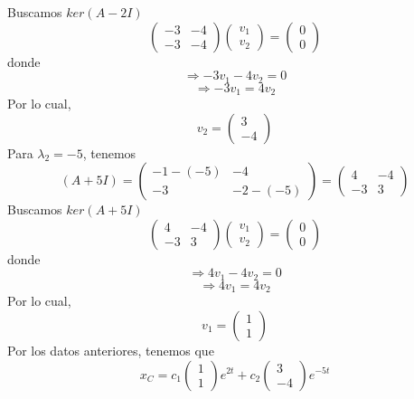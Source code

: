 Buscamos $ker(A-2I)$
\begin{equation*}
\begin{pmatrix}
     -3 & -4\\
     -3 & -4
     \end{pmatrix}
\begin{pmatrix}
v_{1}\\
v_{2}  
\end{pmatrix} =
\begin{pmatrix}
0\\
0  
\end{pmatrix}
\end{equation*} donde
$$\Rightarrow -3v_1-4v_2 = 0$$
$$\Rightarrow -3v_1 = 4v_2$$ Por lo cual, 
$$v_2 = \begin{pmatrix}
3\\
-4
\end{pmatrix}$$ Para $\lambda_2 = -5$, tenemos
\begin{equation*}
     (A+5I) =
     \begin{pmatrix}
     -1-(-5) & -4 \\
     -3 & -2-(-5)
     \end{pmatrix}
     =
     \begin{pmatrix}
     4 & -4\\
     -3 & 3
     \end{pmatrix}
\end{equation*}
Buscamos $ker(A+5I)$
\begin{equation*}
\begin{pmatrix}
     4 & -4\\
     -3 & 3
     \end{pmatrix}
\begin{pmatrix}
v_{1}\\
v_{2}  
\end{pmatrix} =
\begin{pmatrix}
0\\
0  
\end{pmatrix}
\end{equation*} donde
$$\Rightarrow 4v_1-4v_2 = 0$$
$$\Rightarrow 4v_1 = 4v_2$$ Por lo cual, 
$$v_1 = \begin{pmatrix}
1\\
1
\end{pmatrix}$$ Por los datos anteriores, tenemos que 
$$x_C = c_1 \begin{pmatrix}
     1\\
     1
     \end{pmatrix}e^{2t} + c_2 \begin{pmatrix}
     3\\
     -4
     \end{pmatrix}e^{-5t}$$
